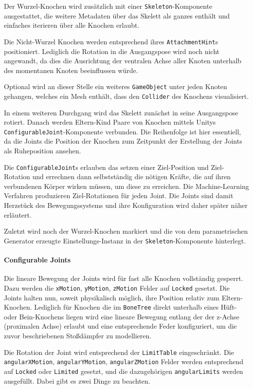 Der Wurzel-Knochen wird zusätzlich mit einer \texttt{Skeleton}-Komponente ausgestattet, die weitere Metadaten über das Skelett als ganzes enthält und einfaches iterieren über alle Knochen erlaubt.

Die Nicht-Wurzel Knochen werden entsprechend ihres \texttt{Attachment\-Hint}s positioniert.
Lediglich die Rotation in die Ausgangspose wird noch nicht angewandt, da dies die Ausrichtung der ventralen Achse aller Knoten unterhalb des momentanen Knoten beeinflussen würde.

Optional wird an dieser Stelle ein weiteres \texttt{Game\-Object} unter jeden Knoten gehangen, welches ein Mesh enthält, dass den \texttt{Collider} des Knochens visualisiert.

In einem weiteren Durchgang wird das Skelett zunächst in seine Ausgangspose rotiert.
Danach werden Eltern-Kind Paare von Knochen mittels Unitys \texttt{Configurable\-Joint}-Komponente verbunden.
Die Reihenfolge ist hier essentiell, da die Joints die Position der Knochen zum Zeitpunkt der Erstellung der Joints als Ruheposition ansehen.

Die \texttt{Configurable\-Joint}s erlauben das setzen einer Ziel-Position und Ziel-Rotation und errechnen dann selbstständig die nötigen Kräfte, die auf ihren verbundenen Körper wirken müssen, um diese zu erreichen.
Die Machine-Learning Verfahren produzieren Ziel-Rotationen für jeden Joint.
Die Joints sind damit Herzstück des Bewegungssystems und ihre Konfiguration wird daher später näher erläutert.

Zuletzt wird noch der Wurzel-Knochen markiert und die von dem parametrischen Generator erzeugte Einstellungs-Instanz in der \texttt{Skeleton}-Komponente hinterlegt.

\paragraph{Configurable Joints}
Die lineare Bewegung der Joints wird für fast alle Knochen vollständig gesperrt.
Dazu werden die \texttt{xMotion}, \texttt{yMotion}, \texttt{zMotion} Felder auf \texttt{Locked} gesetzt.
Die Joints halten nun, soweit physikalisch möglich, ihre Position relativ zum Eltern-Knochen.
Lediglich für Knochen die im \texttt{BoneTree} direkt unterhalb eines Hüft- oder Bein-Knochens liegen wird eine lineare Bewegung entlang der der z-Achse (proximalen Achse) erlaubt und eine entsprechende Feder konfiguriert, um die zuvor beschriebenen Stoßdämpfer zu modellieren.

Die Rotation der Joint wird entsprechend der \texttt{Limit\-Table} eingeschränkt.
Die \texttt{angular\-XMotion}, \texttt{angular\-YMotion}, \texttt{angular\-ZMotion} Felder werden entsprechend auf \texttt{Locked} oder \texttt{Limited} gesetzt, und die dazugehörigen \texttt{angularLimits} werden ausgefüllt.
Dabei gibt es zwei Dinge zu beachten.

